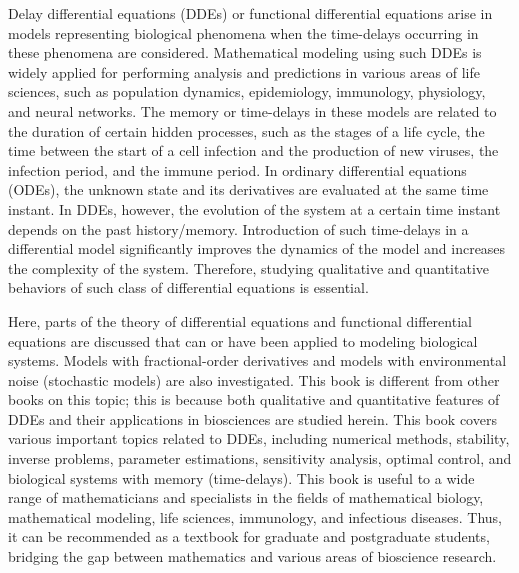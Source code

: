 \documentclass[12pt]{article}
\begin{document}
Delay differential equations (DDEs) or functional differential equations arise in models representing biological phenomena when the 
time-delays occurring in these phenomena are considered. Mathematical modeling using such DDEs is widely applied for performing analysis and 
predictions in various areas of life sciences, such as population dynamics, epidemiology, immunology, physiology, and neural networks. The 
memory or time-delays in these models are related to the duration of certain hidden processes, such as the stages of a life cycle, the time 
between the start of a cell infection and the production of new viruses, the infection period, and the immune period. In ordinary 
differential equations (ODEs), the unknown state and its derivatives are evaluated at the same time instant. In DDEs, however, the evolution 
of the system at a certain time instant depends on the past history/memory. Introduction of such time-delays in a differential model 
significantly improves the dynamics of the model and increases the complexity of the system. Therefore, studying qualitative and quantitative 
behaviors of such class of differential equations is essential.

Here, parts of the theory of differential equations and functional differential equations are discussed that can or have been applied to 
modeling biological systems. Models with fractional-order derivatives and models with environmental noise (stochastic models) are also 
investigated. This book is different from other books on this topic; this is because both qualitative and quantitative features of DDEs and 
their applications in biosciences are studied herein. This book covers various important topics related to DDEs, including numerical methods, 
stability, inverse problems, parameter estimations, sensitivity analysis, optimal control, and biological systems with memory (time-delays). 
This book is useful to a wide range of mathematicians and specialists in the fields of mathematical biology, mathematical modeling, life 
sciences, immunology, and infectious diseases. Thus, it can be recommended as a textbook for graduate and postgraduate students, bridging the 
gap between mathematics and various areas of bioscience research.
\end{document}
